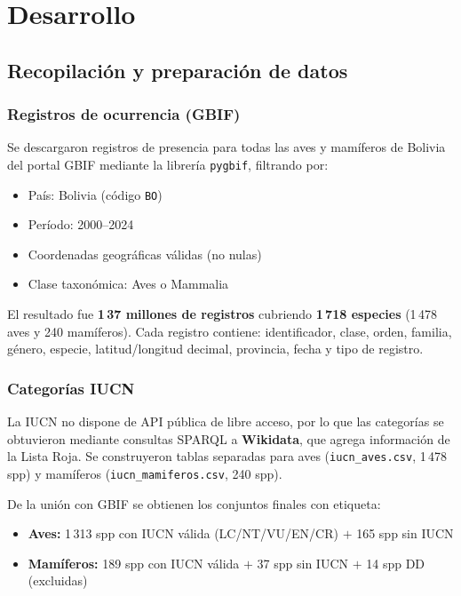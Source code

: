 \documentclass[12pt,a4paper]{article}
\begin{document}
\section{Desarrollo}

\subsection{Recopilación y preparación de datos}

\subsubsection{Registros de ocurrencia (GBIF)}

Se descargaron registros de presencia para todas las aves y mamíferos de Bolivia del portal
GBIF mediante la librería \texttt{pygbif}, filtrando por:
\begin{itemize}[nosep]
  \item País: Bolivia (código \texttt{BO})
  \item Período: 2000--2024
  \item Coordenadas geográficas válidas (no nulas)
  \item Clase taxonómica: Aves o Mammalia
\end{itemize}

El resultado fue \textbf{1\,37 millones de registros} cubriendo \textbf{1\,718 especies}
(1\,478 aves y 240 mamíferos).  Cada registro contiene: identificador, clase, orden, familia,
género, especie, latitud/longitud decimal, provincia, fecha y tipo de registro.

\subsubsection{Categorías IUCN}

La IUCN no dispone de API pública de libre acceso, por lo que las categorías se obtuvieron
mediante consultas SPARQL a \textbf{Wikidata}, que agrega información de la Lista Roja.
Se construyeron tablas separadas para aves (\texttt{iucn\_aves.csv}, 1\,478 spp) y mamíferos
(\texttt{iucn\_mamiferos.csv}, 240 spp).

De la unión con GBIF se obtienen los conjuntos finales con etiqueta:
\begin{itemize}[nosep]
  \item \textbf{Aves:} 1\,313 spp con IUCN válida (LC/NT/VU/EN/CR) $+$ 165 spp sin IUCN
  \item \textbf{Mamíferos:} 189 spp con IUCN válida $+$ 37 spp sin IUCN $+$ 14 spp DD (excluidas)
\end{itemize}
\end{document}
